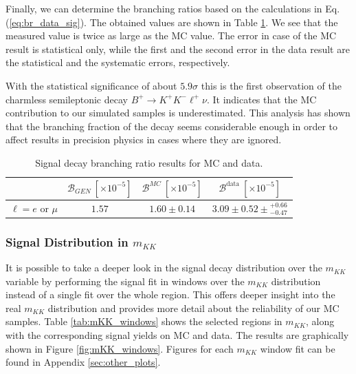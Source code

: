 Finally, we can determine the branching ratios based on the calculations in Eq. (\ref{eq:br_data_sig}). The obtained values are shown in Table \ref{tab:br_result_sig}. We see that the measured value is twice as large as the MC value. The error in case of the MC result is statistical only, while the first and the second error in the data result are the statistical and the systematic errors, respectively.

With the statistical significance of about $5.9\sigma$ this is the first observation of the charmless semileptonic decay $B^+ \to K^+ K^- \ell^+ \nu$. It indicates that the MC contribution to our simulated samples is underestimated. This analysis has shown that the branching fraction of the decay seems considerable enough in order to affect results in precision physics in cases where they are ignored.

\begin{table}[H]
	\centering
	\begin{tabular}{l|c|c|c}
		& $\mathcal{B}_{GEN}~[\times 10^{-5}]$ & $\mathcal{B}^{MC}~[\times 10^{-5}]$ & $\mathcal{B}^{\mathrm{data}}~[\times 10^{-5}]$ \\
		\toprule
		$\ell = e$ or $\mu$ & $1.57$ & $1.60 \pm 0.14$ & $3.09 \pm 0.52 \pm {}^{+0.66}_{-0.47}$\\
		\bottomrule
	\end{tabular}
	\captionsetup{width=.8\linewidth}
	\caption{Signal decay branching ratio results for MC and data.}
	\label{tab:br_result_sig}
\end{table}

\subsubsection{Signal Distribution in \texorpdfstring{$m_{KK}$}{mKK}}

It is possible to take a deeper look in the signal decay distribution over the $m_{KK}$ variable by performing the signal fit in windows over the $m_{KK}$ distribution instead of a single fit over the whole region. This offers deeper insight into the real $m_{KK}$ distribution and provides more detail about the reliability of our MC samples. Table \ref{tab:mKK_windows} shows the selected regions in $m_{KK}$, along with the corresponding signal yields on MC and data. The results are graphically shown in Figure \ref{fig:mKK_windows}. Figures for each $m_{KK}$ window fit can be found in Appendix \ref{sec:other_plots}.

